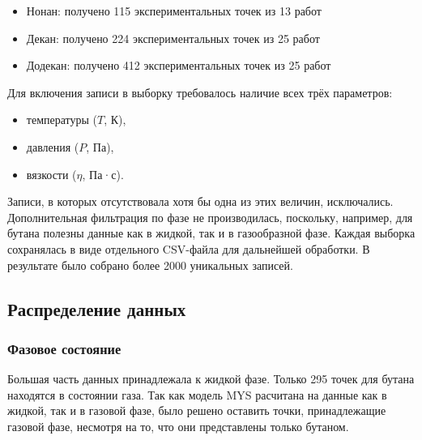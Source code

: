 \documentclass[a4paper,12pt]{article}
\begin{document}
\begin{itemize}
      \item Нонан: получено 115 экспериментальных точек из 13 работ \cite{acs.jced.7b00121,acs.jced.7b00650,j.fluid.2010.10.009,j.jct.2004.09.021,j.jct.2005.03.024,j.jct.2005.10.011,j.jct.2013.09.017,je200757a,je300899n,je400250u,je400835u,je700202h,je700428f}
      \item Декан: получено 224 экспериментальных точек из 25 работ \cite{acs.jced.5b00270,acs.jced.6b00542,acs.jced.7b00121,acs.jced.7b00650,j.fluid.2010.10.009,j.jct.2003.12.005,j.jct.2004.09.021,j.jct.2005.03.024,j.jct.2005.10.011,j.jct.2007.05.016,j.jct.2008.02.005,j.jct.2013.05.014,j.jct.2013.09.017,je034208m,je0501585,je060389r,je300899n,je400250u,je400835u,je4008926,je800348s,je800417q,je800635g,s10765-005-5572-8,s10765-008-0542-6}
      \item Додекан: получено 412 экспериментальных точек из 25 работ \cite{acs.jced.6b00391,acs.jced.6b00542,acs.jced.6b00688,acs.jced.7b00201,acs.jced.7b00466,acs.jced.7b00650,acs.jced.7b00866,acs.jced.8b00008,acs.jced.8b00438,acs.jced.8b01135,acs.jced.8b01233,acs.jced.9b00187,j.fluid.2015.07.022,j.jct.2003.12.005,j.jct.2004.09.021,j.jct.2005.03.024,j.jct.2013.12.022,j.jct.2014.02.012,j.jct.2015.12.021,je034208m,je060491o,je200757a,je400493x,je400835u,je5000132}
    \end{itemize}
    
    Для включения записи в выборку требовалось наличие всех трёх параметров:
    \begin{itemize}
      \item температуры (\( T \), К),
      \item давления (\( P \), Па),
      \item вязкости (\( \eta \), Па·с).
    \end{itemize}
    
    Записи, в которых отсутствовала хотя бы одна из этих величин, исключались. Дополнительная фильтрация по фазе не производилась, поскольку, например, для бутана полезны данные как в жидкой, так и в газообразной фазе. Каждая выборка сохранялась в виде отдельного CSV-файла для дальнейшей обработки. В результате было собрано более 2000 уникальных записей.

  \subsection{Распределение данных}
    \subsubsection{Фазовое состояние}
      Большая часть данных принадлежала к жидкой фазе. Только 295 точек для бутана находятся в состоянии газа. Так как модель MYS расчитана на данные как в жидкой, так и в газовой фазе, было решено оставить точки, принадлежащие газовой фазе, несмотря на то, что они представлены только бутаном.
\end{document}
